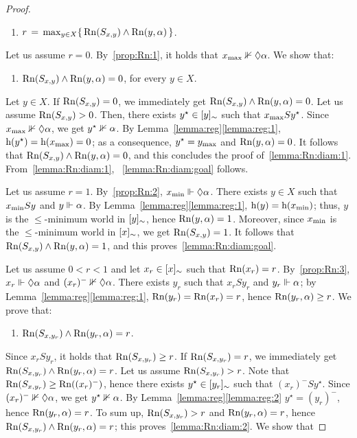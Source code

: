 \begin{proof}
 \begin{enumerate}[label=(\arabic*), ref=(\arabic*),leftmargin=*,start=2]
\item\label{lemma:Rn:diam:goal}
  $r\,=\,\max_{y\in X}\{\,\mathrm{Rn}(S_{x,y})\land \mathrm{Rn}(y,\alpha) \,\}$.
\end{enumerate}
Let us assume $r=0$. By~\ref{prop:Rn:1}, it holds that $x_{\mathrm{max}} \nVdash  \lozenge \alpha$.
We show that:
 \begin{enumerate}[label=(\alph*), ref=(\alph*),leftmargin=*,start=4]
\item\label{lemma:Rn:diam:1}
$\mathrm{Rn}(S_{x,y})\land \mathrm{Rn}(y,\alpha)=0$, for every $y\in X$.
\end{enumerate}
Let $y\in X$. If $\mathrm{Rn}(S_{x,y})=0$, we immediately get  $\mathrm{Rn}(S_{x,y})\land \mathrm{Rn}(y,\alpha)=0$.
Let us assume $\mathrm{Rn}(S_{x,y}) > 0$. Then, there exists $y^\star \in [y]_\sim$ such that
$ x_{\mathrm{max}} S y^\star$. Since  $x_{\mathrm{max}} \nVdash  \lozenge \alpha$, we get $y^\star\nVdash \alpha$.
By Lemma~\ref{lemma:reg}\ref{lemma:reg:1},   $\mathrm{h}(y^\star)= \mathrm{h}(x_{\mathrm{max}}) = 0$; as a consequence,    $y^\star = y_{\mathrm{max}}$ and $\mathrm{Rn}(y,\alpha)=0$.
It follows that  $\mathrm{Rn}(S_{x,y})\land \mathrm{Rn}(y,\alpha)=0$,
and this concludes the proof of~\ref{lemma:Rn:diam:1}. From~\ref{lemma:Rn:diam:1},
~\ref{lemma:Rn:diam:goal} follows.


Let us assume $r=1$. By~\ref{prop:Rn:2},  $x_{\mathrm{min}}\Vdash \lozenge \alpha$.
There exists $y\in X$ such that  $x_{\mathrm{min}} S y$ and
$y\Vdash \alpha$.
By Lemma~\ref{lemma:reg}\ref{lemma:reg:1}, $\mathrm{h}(y)=\mathrm{h}(x_{\mathrm{min}})$;
thus,  $y$ is the $\leq$-minimum world in $[y]_\sim$, hence $\mathrm{Rn}(y,\alpha)=1$.
Moreover, since $x_{\mathrm{min}}$ is the $\leq$-minimum world in $[x]_\sim$, we get $\mathrm{Rn}(S_{x,y})=1$.
It follows that  $\mathrm{Rn}(S_{x,y})\land\mathrm{Rn}(y,\alpha) =1$, and this proves~\ref{lemma:Rn:diam:goal}.


Let us assume $0 < r < 1$ and let  $x_r\in  [x]_\sim$ such that  $\mathrm{Rn}(x_r)=r$.
By~\ref{prop:Rn:3},    $x_r\Vdash \lozenge \alpha$  and   $(x_r)^-\nVdash \lozenge \alpha$. 
There exists $y_r$ such that  $ x_r S y_r$ and  $y_r\Vdash \alpha$;
by Lemma~\ref{lemma:reg}\ref{lemma:reg:1},
 $\mathrm{Rn}(y_r)=  \mathrm{Rn}(x_r) = r$, hence $\mathrm{Rn}(y_r,\alpha)\geq r$.
We prove that:

\begin{enumerate}[label=(\alph*), ref=(\alph*),leftmargin=*,start=5]
\item\label{lemma:Rn:diam:2}
$\mathrm{Rn}(S_{x,{y_r}})\land \mathrm{Rn}(y_r,\alpha)= r$.
\end{enumerate}
Since $x_r S y_r$, it holds that $\mathrm{Rn}(S_{x,{y_r}})\geq r$.
If  $\mathrm{Rn}(S_{x,{y_r}}) = r$, we immediately get $\mathrm{Rn}(S_{x,{y_r}})\land \mathrm{Rn}(y_r,\alpha)= r$.
Let us assume   $\mathrm{Rn}(S_{x,{y_r}})> r$.  Note that  $\mathrm{Rn}(S_{x,{y_r}})\geq  \mathrm{Rn}((x_r)^-)$,
hence there exists $y^\star\in [y_r]_\sim$ such
  that $(x_r)^- S y^\star$.
  Since $(x_r)^-\nVdash \lozenge\alpha$, we get  $y^\star\nVdash \alpha$.
  By Lemma~\ref{lemma:reg}\ref{lemma:reg:2} $y^\star =(y_r)^-$, hence $\mathrm{Rn}(y_r,\alpha)=r$.
  To sum up,   $\mathrm{Rn}(S_{x,{y_r}})> r$ and $\mathrm{Rn}(y_r,\alpha)=r$, hence
  $\mathrm{Rn}(S_{x,{y_r}})\land \mathrm{Rn}(y_r,\alpha)= r$; this proves~\ref{lemma:Rn:diam:2}.
We show that
  

\end{proof}
